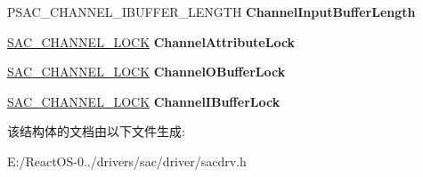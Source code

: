 \begin{DoxyCompactItemize}
P\+S\+A\+C\+\_\+\+C\+H\+A\+N\+N\+E\+L\+\_\+\+I\+B\+U\+F\+F\+E\+R\+\_\+\+L\+E\+N\+G\+TH {\bfseries Channel\+Input\+Buffer\+Length}
\item 
\mbox{\label{struct___s_a_c___c_h_a_n_n_e_l_a91e1924136893684a26ad8bfed3ed853}} 
\hyperlink{struct___s_a_c___c_h_a_n_n_e_l___l_o_c_k}{S\+A\+C\+\_\+\+C\+H\+A\+N\+N\+E\+L\+\_\+\+L\+O\+CK} {\bfseries Channel\+Attribute\+Lock}
\item 
\mbox{\label{struct___s_a_c___c_h_a_n_n_e_l_a677656225cfaab3e46f601dad5b57fb9}} 
\hyperlink{struct___s_a_c___c_h_a_n_n_e_l___l_o_c_k}{S\+A\+C\+\_\+\+C\+H\+A\+N\+N\+E\+L\+\_\+\+L\+O\+CK} {\bfseries Channel\+O\+Buffer\+Lock}
\item 
\mbox{\label{struct___s_a_c___c_h_a_n_n_e_l_ad423e63361cef700effd8e8829b98c0f}} 
\hyperlink{struct___s_a_c___c_h_a_n_n_e_l___l_o_c_k}{S\+A\+C\+\_\+\+C\+H\+A\+N\+N\+E\+L\+\_\+\+L\+O\+CK} {\bfseries Channel\+I\+Buffer\+Lock}
\end{DoxyCompactItemize}


该结构体的文档由以下文件生成\+:\begin{DoxyCompactItemize}
\item 
E\+:/\+React\+O\+S-\/0../drivers/sac/driver/sacdrv.\+h\end{DoxyCompactItemize}
